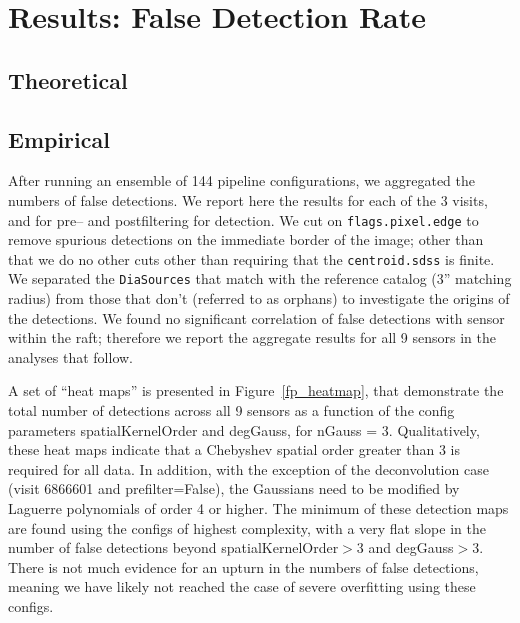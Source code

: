 \documentclass[prd, nofootinbib, floatfix, 11pt,tightenlines,times]{article}
\begin{document}
\section{Results: False Detection Rate}

\subsection{Theoretical \label{sec-analyticfp}}

\subsection{Empirical}

After running an ensemble of 144 pipeline configurations, we
aggregated the numbers of false detections.  We report here the results for
each of the 3 visits, and for pre-- and postfiltering for
detection.  We cut on {\tt flags.pixel.edge} to remove spurious
detections on the immediate border of the image; other than that we do
no other cuts other than requiring that the {\tt centroid.sdss} is
finite.  We separated the {\tt DiaSources} that match with the reference
catalog (3'' matching radius) from those that don't (referred to as
orphans) to investigate the origins of the detections.  We found no
significant correlation of false detections with sensor within the
raft; therefore we report the aggregate results for all 9 sensors in
the analyses that follow.

A set of ``heat maps'' is presented in Figure~\ref{fp_heatmap}, that
demonstrate the total number of detections across all 9 sensors as a
function of the config parameters spatialKernelOrder and degGauss, for
nGauss = 3.  Qualitatively, these heat maps indicate that a Chebyshev
spatial order greater than 3 is required for all data.  In addition,
with the exception of the deconvolution case (visit 6866601 and
prefilter=False), the Gaussians need to be modified by Laguerre
polynomials of order 4 or higher.  The minimum of these detection maps
are found using the configs of highest complexity, with a very flat
slope in the number of false detections beyond spatialKernelOrder$>$3
and degGauss$>$3.  There is not much evidence for an upturn in the
numbers of false detections, meaning we have likely not reached the
case of severe overfitting using these configs.
\end{document}

